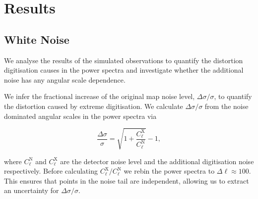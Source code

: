 \documentclass[a4paper,fleqn,usenatbib]{mnras}
\begin{document}
\section{Results}
\label{sec:results}

\subsection{White Noise}
\label{subsec:whitenoise}

We analyse the results of the simulated observations to quantify the distortion digitisation causes in the power spectra and investigate whether the additional noise has any angular scale dependence.

We infer the fractional increase of the original map noise level, $\Delta \sigma / \sigma$, to quantify the distortion caused by extreme digitisation. We calculate $\Delta \sigma / \sigma$ from the noise dominated angular scales in the power spectra via

\begin{equation}
\frac{\Delta \sigma}{\sigma} = \sqrt{1 + \frac{C_\ell^\mathrm{X}}{C_\ell^{\mathrm{N}}}} - 1,
\end{equation}

where $C_\ell^{\mathrm{N}}$ and $C_\ell^\mathrm{X}$ are the detector noise level and the additional digitisation noise respectively. Before calculating $C_\ell^\mathrm{X}/C_\ell^\mathrm{N}$ we rebin the power spectra to $\Delta \ell \approx 100$. This ensures that points in the noise tail are independent, allowing us to extract an uncertainty for $\Delta \sigma / \sigma$.




\end{document}
